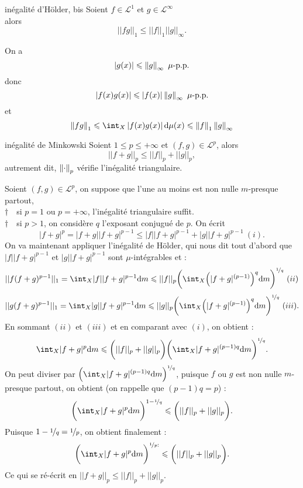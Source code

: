 \documentclass[a4paper,11pt, twoside]{article}
\begin{document}
\begin{propC}{inégalité d'Hölder, bis}
  Soient $f\in\mathcal L^1$ et $g\in\mathcal L^\infty$\\

  alors
  $$||fg||_1\leqslant||f||_1||g||_\infty.$$
\end{propC}


\begin{Proof}
  On a 
  $$\left| g(x)\right|\leqslant \left\lVert g\right\rVert_\infty\ \mu\text{-p.p.}$$
  donc 
  $$\left| f(x)g(x)\right|\leqslant \left| f(x)\right|\left\lVert g\right\rVert_\infty\ \mu\text{-p.p.}$$
  et
  $$\norm{fg}_1\leqslant\int_X\abs{f(x)g(x)}\mathrm d\mu(x)\leqslant\norm{f}_1\norm{g}_\infty$$
\end{Proof}
  
  
\begin{propC}{inégalité de Minkowski}
  Soient $1\leqslant p\leqslant+\infty$ et $(f,g)\in\mathcal L^p$, alors\\
  
  $$||f+g||_p\leqslant ||f||_p+||g||_p,$$
  autrement dit, $\left\lVert\cdot\right\rVert_p$ vérifie l'inégalité triangulaire.
\end{propC}
  
\begin{Proof}
  Soient $(f,g)\in\mathcal L^p$, on suppose que l'une au moins est non nulle $m$-presque partout,\\
  $\dagger\quad$si $p=1$ ou $p=+\infty$, l'inégalité triangulaire suffit.\\
  $\dagger\quad$si $p>1$, on considère $q$ l'exposant conjugué de $p$. On écrit $$|f+g|^p=|f+g||f+g|^{p-1}\leqslant|f||f+g|^{p-1}+|g||f+g|^{p-1}\ (i).$$ On va maintenant appliquer l'inégalité de Hölder, qui nous dit tout d'abord que $|f||f+g|^{p-1}$ et $|g||f+g|^{p-1}$ sont $\mu$-intégrables et :
  $$||f(f+g)^{p-1}||_1=\int_X|f||f+g|^{p-1}\mathrm dm \leqslant ||f||_p\bigg(\int_X\Big(|f+g|^{(p-1)}\Big)^q\mathrm dm\bigg)^{\nicefrac1q}\ (ii)$$
  $$||g(f+g)^{p-1}||_1=\int_X|g||f+g|^{p-1}\mathrm dm \leqslant ||g||_p\bigg(\int_X\Big(|f+g|^{(p-1)}\Big)^q\mathrm dm\bigg)^{\nicefrac1q}\ (iii).$$
  En sommant $(ii)$ et $(iii)$ et en comparant avec $(i)$, on obtient :
  $$\int_X|f+g|^p\mathrm dm \leqslant \bigg(||f||_p+||g||_p\bigg)\bigg(\int_X|f+g|^{(p-1)q}\mathrm dm\bigg)^{\nicefrac1q}.$$
  On peut diviser par $\dstyle\Big(\int_X|f+g|^{(p-1)q}\mathrm dm\Big)^{\nicefrac1q}$, puisque $f$ ou $g$ est non nulle $m$-presque partout, on obtient (on rappelle que $(p-1)q=p$) :
  $$\bigg(\int_X|f+g|^p\mathrm dm\bigg)^{1-\nicefrac1q} \leqslant \bigg(||f||_p+||g||_p\bigg).$$
  Puisque $\displaystyle1-\nicefrac1q=\nicefrac1p$, on obtient finalement :
  $$\bigg(\int_X|f+g|^p\mathrm dm\bigg)^{\nicefrac1p:} \leqslant \bigg(||f||_p+||g||_p\bigg).$$
  Ce qui se ré-écrit en $||f+g||_p\leqslant ||f||_p+||g||_p$.
\end{Proof}
\end{document}
